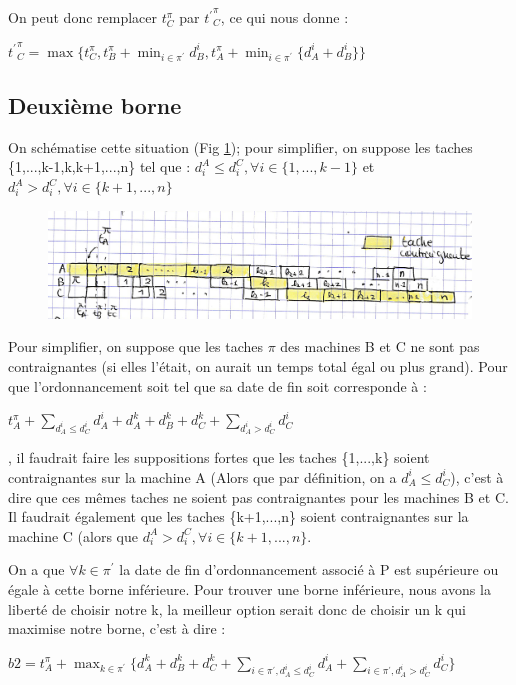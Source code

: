 \documentclass[12pt]{article}
\begin{document}
On peut donc remplacer $t_C^\pi$ par ${t^\prime}_C^\pi$, ce qui nous donne :\\
\begin{center}
${t^\prime}_C^\pi = \max\{t_C^\pi,t_B^\pi + \displaystyle\min_{i \in \pi^\prime} d_B^i, t_A^\pi + \displaystyle\min_{i \in \pi^\prime}\{d_A^i + d_B^i\}\}$
\end{center}

\subsection{Deuxième borne}

On schématise cette situation (Fig \ref{cas31}); pour simplifier, on suppose les taches \{1,...,k-1,k,k+1,...,n\} tel que : $d_i^A \le d_i^C, \forall i \in \{1,...,k-1\}$ et $d_i^A > d_i^C, \forall i \in \{k+1,...,n\}$

\begin{figure}[!ht]
\centering
\centerline{\includegraphics[scale=1]{10.jpg}}
\caption{}
\label{cas31}
\end{figure}

Pour simplifier, on suppose que les taches $\pi$ des machines B et C ne sont pas contraignantes (si elles l'était, on aurait un temps total égal ou plus grand). Pour que l'ordonnancement soit tel que sa date de fin soit corresponde à :\\
\begin{center}
$t_A^\pi + \displaystyle\sum_{d_A^i \le d_C^i}d_A^i + d_A^k + d_B^k + d_C^k + \displaystyle\sum_{d_A^i > d_C^i}d_C^i$\\
\end{center}
, il faudrait faire les suppositions fortes que les taches \{1,...,k\} soient contraignantes sur la machine A (Alors que par définition, on a $d_A^i \le d_C^i$), c'est à dire que ces mêmes taches ne soient pas contraignantes pour les machines B et C. Il faudrait également que les taches \{k+1,...,n\} soient contraignantes sur la machine C (alors que $d_i^A > d_i^C, \forall i \in \{k+1,...,n\}$.

On a que $\forall k \in \pi^\prime$ la date de fin d'ordonnancement associé à P est supérieure ou égale à cette borne inférieure. Pour trouver une borne inférieure, nous avons la liberté de choisir notre k, la meilleur option serait donc de choisir un k qui maximise notre borne, c'est à dire :\\
\begin{center}
 $b2 = t_A^\pi + \displaystyle\max_{k \in \pi^\prime}\{d_A^k + d_B^k + d_C^k + \displaystyle\sum_{i \in \pi^\prime,d_A^i \le d_C^i} d_A^i + \displaystyle\sum_{i \in \pi^\prime,d_A^i > d_C^i} d_C^i\} $\\
\end{center}
\end{document}
